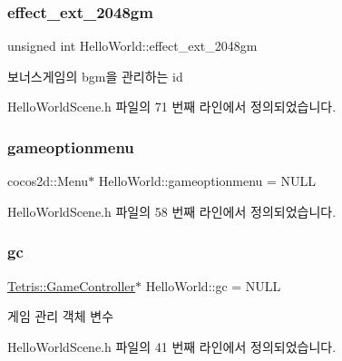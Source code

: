 \subsubsection{\texorpdfstring{effect\+\_\+ext\+\_\+2048gm}{effect\_ext\_2048gm}}
{\footnotesize\ttfamily unsigned int Hello\+World\+::effect\+\_\+ext\+\_\+2048gm\hspace{0.3cm}{\ttfamily [protected]}}



보너스게임의 bgm을 관리하는 id 



Hello\+World\+Scene.\+h 파일의 71 번째 라인에서 정의되었습니다.

\mbox{\label{class_hello_world_aeb27a8750393a2d4982809b64454a045}} 
\subsubsection{\texorpdfstring{gameoptionmenu}{gameoptionmenu}}
{\footnotesize\ttfamily cocos2d\+::\+Menu$\ast$ Hello\+World\+::gameoptionmenu = N\+U\+LL\hspace{0.3cm}{\ttfamily [protected]}}



Hello\+World\+Scene.\+h 파일의 58 번째 라인에서 정의되었습니다.

\mbox{\label{class_hello_world_a547cb213126911d9a7151f8259dc7102}} 
\subsubsection{\texorpdfstring{gc}{gc}}
{\footnotesize\ttfamily \hyperlink{class_tetris_1_1_game_controller}{Tetris\+::\+Game\+Controller}$\ast$ Hello\+World\+::gc = N\+U\+LL\hspace{0.3cm}{\ttfamily [protected]}}



게임 관리 객체 변수 



Hello\+World\+Scene.\+h 파일의 41 번째 라인에서 정의되었습니다.

\mbox{\label{class_hello_world_a6dcd196f83b5eba681717366944fcddf}} 
